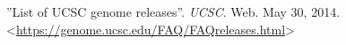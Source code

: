   ''List of UCSC genome releases''. \textit{UCSC}. Web. May 30, 2014. <\url{https://genome.ucsc.edu/FAQ/FAQreleases.html}>